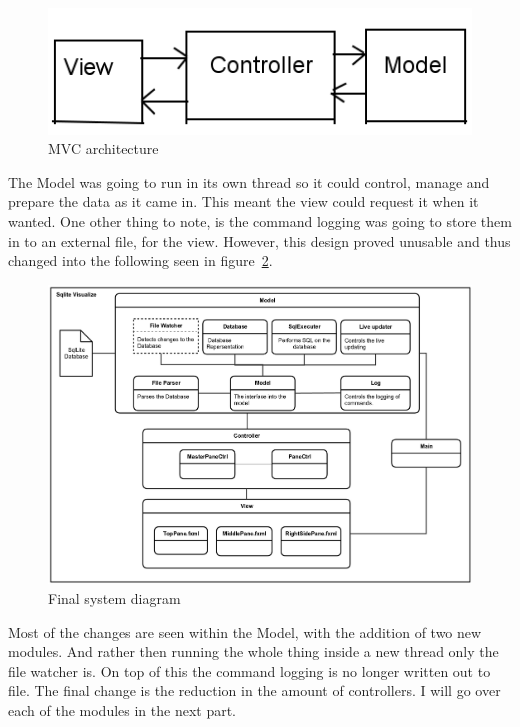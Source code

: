 \begin{figure}[H]
	\centering
	\includegraphics[scale=0.5]{images/mvc.png}
	\caption{MVC architecture}
	\label{fig:mvc}
\end{figure}

The Model was going to run in its own thread so it could control, manage and prepare the data as it came in. This meant the view could request it when it wanted. One other thing to note, is the command logging was going to store them in to an external file, for the view. However, this design proved unusable and thus changed into the following seen in figure~\ref{fig:design_new}. 

\begin{figure}[H]
	\centering
	\includegraphics[scale=0.2]{images/system_diagram_new.png}
	\caption{Final system diagram}
	\label{fig:design_new}
\end{figure}

Most of the changes are seen within the Model, with the addition of two new modules. And rather then running the whole thing inside a new thread only the file watcher is. On top of this the command logging is no longer written out to file. The final change is the reduction in the amount of controllers. I will go over each of the modules in the next part.

